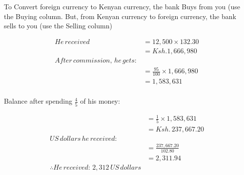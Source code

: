 \documentclass[
  a4paperpaper,
]{scrbook}
\begin{document}
\begin{tcolorbox}[enhanced jigsaw, left=2mm, colframe=quarto-callout-caution-color-frame, toptitle=1mm, opacitybacktitle=0.6, rightrule=.15mm, colbacktitle=quarto-callout-caution-color!10!white, colback=white, arc=.35mm, breakable, leftrule=.75mm, bottomtitle=1mm, bottomrule=.15mm, title=\textcolor{quarto-callout-caution-color}{\faFire}\hspace{0.5em}{Solution}, titlerule=0mm, coltitle=black, toprule=.15mm, opacityback=0]

To Convert foreign currency to Kenyan currency, the bank Buys from you
(use the Buying column. But, from Kenyan currency to foreign currency,
the bank sells to you (use the Selling column)

\begin{align*}
He\, received &=12,500 \times 132.30 \\&=Ksh. 1,666,980\\
After \,commission,\, he \,gets:\\ &= \frac{95}{100}\times 1,666,980\\&=1,583,631\\
\end{align*}

Balance after spending \(\frac{4}{5}\) of his money:

 \begin{align*}
 &=\frac{1}{5}\times 1,583,631\\&=Ksh.\, 237,667.20 \\US\, dollars\, he\, received: \\
&=\frac{237,667.20}{102.80}\\&=2,311.94\\
 \therefore He \,received: \,2,312 \,US \,dollars 
\end{align*}

\end{tcolorbox}
\end{document}

